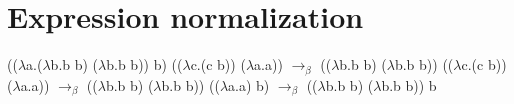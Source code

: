 \documentclass{article}
\begin{document}
\section{Expression normalization}
{
\Large
(($\lambda$a.($\lambda$b.b b) ($\lambda$b.b b)) b) (($\lambda$c.(c b)) ($\lambda$a.a)) \newline
$\rightarrow_\beta$ (($\lambda$b.b b) ($\lambda$b.b b)) (($\lambda$c.(c b)) ($\lambda$a.a)) \newline
$\rightarrow_\beta$ (($\lambda$b.b b) ($\lambda$b.b b)) (($\lambda$a.a) b) \newline
$\rightarrow_\beta$ (($\lambda$b.b b) ($\lambda$b.b b)) b
}
\end{document}
